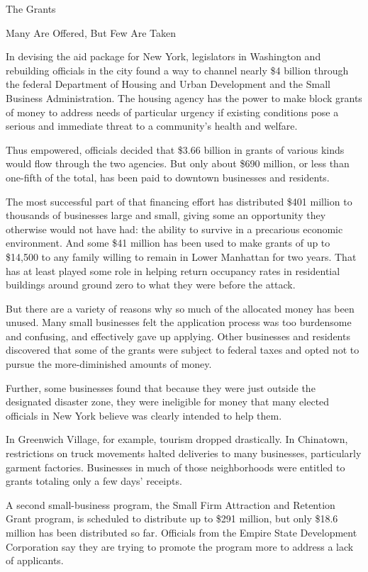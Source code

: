 The Grants

Many Are Offered, But Few Are Taken

In devising the aid package for New York, legislators in Washington and
rebuilding officials in the city found a way to channel nearly \$4
billion through the federal Department of Housing and Urban Development
and the Small Business Administration. The housing agency has the power
to make block grants of money to address needs of particular urgency if
existing conditions pose a serious and immediate threat to a community's
health and welfare.

Thus empowered, officials decided that \$3.66 billion in grants of
various kinds would flow through the two agencies. But only about \$690
million, or less than one-fifth of the total, has been paid to downtown
businesses and residents.

The most successful part of that financing effort has distributed \$401
million to thousands of businesses large and small, giving some an
opportunity they otherwise would not have had: the ability to survive in
a precarious economic environment. And some \$41 million has been used
to make grants of up to \$14,500 to any family willing to remain in
Lower Manhattan for two years. That has at least played some role in
helping return occupancy rates in residential buildings around ground
zero to what they were before the attack.

But there are a variety of reasons why so much of the allocated money
has been unused. Many small businesses felt the application process was
too burdensome and confusing, and effectively gave up applying. Other
businesses and residents discovered that some of the grants were subject
to federal taxes and opted not to pursue the more-diminished amounts of
money.

Further, some businesses found that because they were just outside the
designated disaster zone, they were ineligible for money that many
elected officials in New York believe was clearly intended to help them.

In Greenwich Village, for example, tourism dropped drastically. In
Chinatown, restrictions on truck movements halted deliveries to many
businesses, particularly garment factories. Businesses in much of those
neighborhoods were entitled to grants totaling only a few days'
receipts.

A second small-business program, the Small Firm Attraction and Retention
Grant program, is scheduled to distribute up to \$291 million, but only
\$18.6 million has been distributed so far. Officials from the Empire
State Development Corporation say they are trying to promote the program
more to address a lack of applicants.

